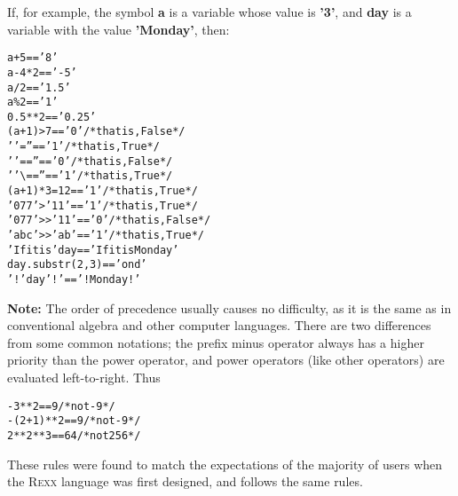  If, for example, the symbol \textbf{a} is a variable whose value
is \textbf{'3'}, and \textbf{day} is a variable with the
value \textbf{'Monday'}, then:
\begin{alltt}
a+5              ==  '8'
a-4*2            ==  '-5'
a/2              ==  '1.5'
a\%2              ==  '1'
0.5**2           ==  '0.25'
(a+1)>7          ==  '0'            /* that is, False */
' '=''           ==  '1'            /* that is, True  */
' '==''          ==  '0'            /* that is, False */
' '\textbackslash ==''        ==  '1'            /* that is, True  */
(a+1)*3=12       ==  '1'            /* that is, True  */
'077'>'11'       ==  '1'            /* that is, True  */
'077'>>'11'      ==  '0'            /* that is, False */
'abc'>>'ab'      ==  '1'            /* that is, True  */
'If it is' day   ==  'If it is Monday'
day.substr(2,3)  ==  'ond'
'!'day'!'        ==  '!Monday!'
\end{alltt}
\begin{shaded}
\textbf{Note: }The \nr{} order of precedence usually causes no difficulty, as it
is the same as in conventional algebra and other computer languages.
There are two differences from some common notations; the prefix minus
operator always has a higher priority than the power operator, and
power operators (like other operators) are evaluated left-to-right.
Thus
\begin{alltt}
-3**2      ==  9    /* not -9  */
-(2+1)**2  ==  9    /* not -9  */
2**2**3    ==  64   /* not 256 */
\end{alltt}
 \end{shaded}
These rules were found to match the expectations of the majority of
users when the R\textsc{exx} language was first designed, and \nr{} follows the
same rules.
